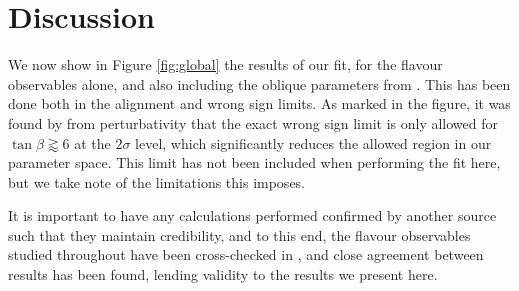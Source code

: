 \documentclass[a4paper,12pt]{article}
\begin{document}
\section{Discussion}
\label{sec:discuss}
We now show in Figure \ref{fig:global} the results of our fit, for the flavour observables alone, and also including the oblique parameters from \cite{james}.
This has been done both in the alignment and wrong sign limits. 
As marked in the figure, it was found by \cite{oliver} from perturbativity that the exact wrong sign limit is only allowed for $\tan\beta\gtrapprox6$ at the $2\sigma$ level, which significantly reduces the allowed region in our parameter space. 
This limit has not been included when performing the fit here, but we take note of the limitations this imposes.

It is important to have any calculations performed confirmed by another source such that they maintain credibility, and to this end, the flavour observables studied throughout have been cross-checked in \cite{tom}, and close agreement between results has been found, lending validity to the results we present here. 
\end{document}
